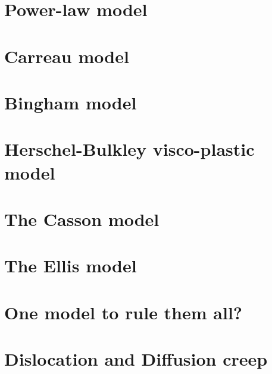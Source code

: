 \section{Power-law model \label{ss:powerlaw}} 


\section{Carreau model}


\section{Bingham model} \label{sec:bingham}


\section{Herschel-Bulkley visco-plastic model}


\section{The Casson model}


\section{The Ellis model\label{ss:ellis}}


\section{One model to rule them all? \label{ss:cross}}


\section{Dislocation and Diffusion creep}


